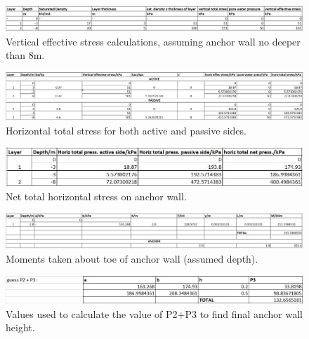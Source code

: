 \documentclass[12pt, a4paper]{article}
\begin{document}
\begin{appendices}
\begin{figure}[H]
  \centering
  	\includegraphics[width=0.7\textheight]{anchorwall2}
   	\caption{Vertical effective stress calculations, assuming anchor wall no deeper than 8m.}
	\label{anchor2}
\end{figure}



\begin{figure}[H]
  \centering
  	\includegraphics[width=0.7\textheight]{anchorwall3}
   	\caption{Horizontal total stress for both active and passive sides.}
	\label{anchor3}
\end{figure}




\begin{figure}[H]
  \centering
  	\includegraphics[width=0.7\textheight]{anchorwall4}
   	\caption{Net total horizontal stress on anchor wall.}
	\label{anchor4}
\end{figure}





\begin{figure}[H]
  \centering
  	\includegraphics[width=0.7\textheight]{anchorwall5}
   	\caption{Moments taken about toe of anchor wall (assumed depth).}
	\label{anchor5}
\end{figure}

\begin{figure}[H]
  \centering
  	\includegraphics[width=0.7\textheight]{anchorwall6}
   	\caption{Values used to calculate the value of P2+P3 to find final anchor wall height.}
	\label{anchor6}
\end{figure}


\end{appendices}
\end{document}

